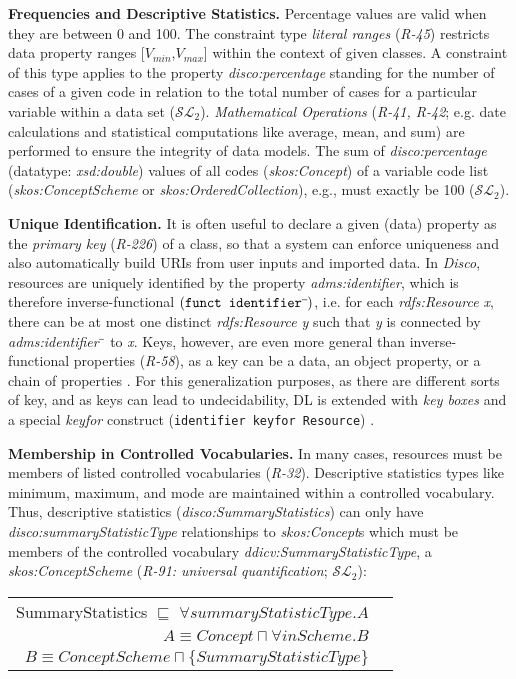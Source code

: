 \documentclass{llncs}
\newcommand{\ms}[1]{\texttt{#1}}
\newenvironment{DL}{
  \vspace{0cm}
  \begin{tabular}{r l}

}{
  \end{tabular}
}
\begin{document}
{{\textbf{Frequencies and Descriptive Statistics.}
Percentage values are valid when they are between 0 and 100.
The constraint type \emph{literal ranges} (\emph{R-45}) restricts data property ranges [$V_{min}$,$V_{max}$] within the context of given classes.
A constraint of this type applies to the property \emph{disco:percentage} standing for the number of cases of a given code in relation to the total number of cases for a particular variable within a data set ($\mathcal{SL}_{2}$).
{\em Mathematical Operations} (\emph{R-41, R-42}; e.g. date calculations and statistical computations like average, mean, and sum) are performed to ensure the integrity of data models.
The sum of {\em disco:percentage} (datatype: {\em xsd:double}) values of all codes ({\em skos:Concept}) of a variable code list ({\em skos:ConceptScheme} or {\em skos:OrderedCollection}), e.g., must exactly be 100 ($\mathcal{SL}_{2}$).

\textbf{Unique Identification.}
It is often useful to declare a given (data) property as the \emph{primary key} (\emph{R-226}) of a class, so that a system can enforce uniqueness and also automatically build URIs from user inputs and imported data. 
In \emph{Disco}, resources are uniquely identified by the property \emph{adms:identifier},
which is therefore inverse-functional
$(\ms{funct identifier}\sp{\overline{\ }})$,
i.e. for each \emph{rdfs:Resource x}, there can be at most one distinct \emph{rdfs:Resource y} such that \emph{y} is connected by \emph{adms:identifier$\sp{\overline{\ }}$} to \emph{x}.
Keys, however, are even more general than inverse-functional properties (\emph{R-58}),
as a key can be a data, an object property, or a chain of properties \cite{Schneider2009}.
For this generalization purposes, as there are different sorts of key, and as keys can lead to undecidability, 
DL is extended with \emph{key boxes} and a special \emph{keyfor} construct (\ms{identifier \ms{keyfor} Resource}) \cite{Lutz2005}.

\textbf{Membership in Controlled Vocabularies.}
In many cases, resources must be members of listed controlled vocabularies (\emph{R-32}).
Descriptive statistics types like minimum, maximum, and mode are maintained within a controlled vocabulary.  
Thus, descriptive statistics (\emph{disco:SummaryStatistics}) can only have \emph{disco:summaryStatisticType} relationships to \emph{skos:Concept}s which must be members of the controlled vocabulary \emph{ddicv:SummaryStatisticType}, a \emph{skos:ConceptScheme} (\emph{R-91: universal quantification}; $\mathcal{SL}_{2}$):
\begin{center}
\begin{DL}
SummaryStatistics $\sqsubseteq$ $\forall summaryStatisticType.A$ \\
$A \equiv Concept \sqcap \forall inScheme . B$ \\
$B \equiv ConceptScheme \sqcap \{SummaryStatisticType\}$
\end{DL}
\end{center}

}}
\end{document}
